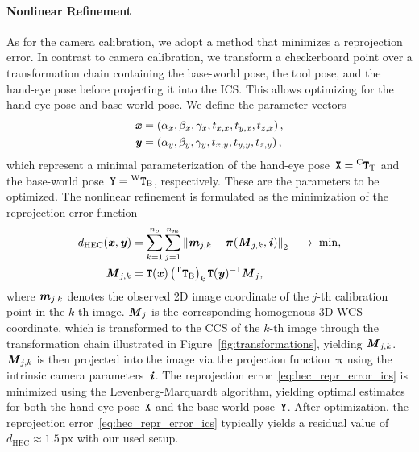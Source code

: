 \documentclass[a4paper,fleqn]{cas-dc}
\newcommand{\Vector}[1]{{\ensuremath{\textbf{\textit{#1}}}}}
\newcommand{\Matrix}[1]{{\ensuremath{\textbf{\texttt{#1}}}}}
\newcommand{\TMatrix}[3]{{^{\mathrm{#1}}\Matrix{#2}_{\mathrm{#3}}}}
\begin{document}
\paragraph{Nonlinear Refinement}
As for the camera calibration, we adopt a method that minimizes a reprojection error. In contrast to camera calibration, we transform a checkerboard point over a transformation chain containing the base-world pose, the tool pose, and the hand-eye pose before projecting it into the ICS. This allows optimizing for the hand-eye pose and base-world pose. We define the parameter vectors
\begin{equation}
    \begin{split}
        \Vector{x} &= \left( \alpha_x, \beta_x, \gamma_x, t_{x,x}, t_{y,x}, t_{z,x} \right),\\
        \Vector{y} &= \left( \alpha_y, \beta_y, \gamma_y, t_{x,y}, t_{y,y}, t_{z,y} \right),
    \end{split}
\end{equation}
which represent a minimal parameterization of the hand-eye pose~$\Matrix{X}=\TMatrix{C}{T}{T}$ and the base-world pose~$\Matrix{Y}=\TMatrix{W}{T}{B}$, respectively. These are the parameters to be optimized. The nonlinear refinement is formulated as the minimization of the reprojection error function
\begin{equation}
    \begin{split}
        \label{eq:hec_repr_error_ics}
        d_{\mathrm{HEC}}(\Vector{x}, \Vector{y})
            &= \sum_{k=1}^{n_o} \sum_{j=1}^{n_m}
                \left\|
                    \Vector{m}_{j,k} -
                    \boldsymbol{\pi}\!\left(
                        \Vector{M}_{j,k}, \Vector{i}
                    \right)
                \right\|_2
            \;\longrightarrow\; \min, \\
        \Vector{M}_{j,k} &= \Matrix{T}(\Vector{x})\left(\TMatrix{T}{T}{B}\right)_k\Matrix{T}(\Vector{y})^{-1}
                        \Vector{M}_j,
    \end{split}
\end{equation}
where $\Vector{m}_{j,k}$ denotes the observed 2D image coordinate of the $j$-th calibration point in the $k$-th image. $\Vector{M}_j$ is the corresponding homogenous 3D WCS coordinate, which is transformed to the CCS of the $k$-th image through the transformation chain illustrated in Figure~\ref{fig:transformations}, yielding $\Vector{M}_{j,k}$. $\Vector{M}_{j,k}$ is then projected into the image via the projection function~$\boldsymbol{\pi}$ using the intrinsic camera parameters~\Vector{i}. The reprojection error~\eqref{eq:hec_repr_error_ics} is minimized using the Levenberg-Marquardt algorithm, yielding optimal estimates for both the hand-eye pose~\Matrix{X} and the base-world pose~\Matrix{Y}. After optimization, the reprojection error~\eqref{eq:hec_repr_error_ics} typically yields a residual value of $d_{\mathrm{HEC}}\approx 1.5\,\mathrm{px}$ with our used setup.
\end{document}
